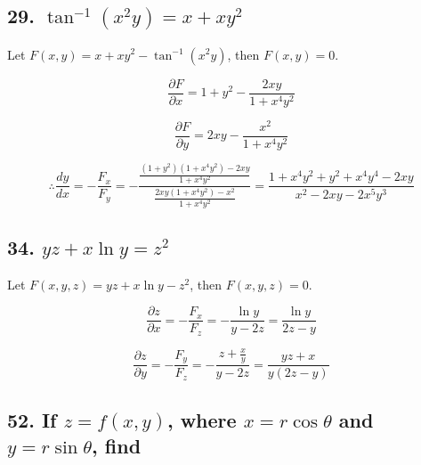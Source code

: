 \documentclass{article}
\begin{document}
    \subsection*{29. $\tan^{-1}(x^2y) = x+xy^2$}

    Let $F(x, y) = x + xy^2 - \tan^{-1}(x^2y)$, then $F(x, y) = 0$.
    
    $$\frac{\partial F}{\partial x} = 1 + y^2 - \frac{2xy}{1+x^4y^2}$$

    $$\frac{\partial F}{\partial y} = 2xy - \frac{x^2}{1+x^4y^2}$$

    $$\therefore \frac{dy}{dx} = -\frac{F_x}{F_y} = -\frac{\frac{(1+y^2)(1+x^4y^2)-2xy}{1+x^4y^2}}{\frac{2xy(1+x^4y^2)-x^2}{1+x^4y^2}} = \frac{1+x^4y^2+y^2+x^4y^4-2xy}{x^2-2xy-2x^5y^3}$$

    \subsection*{34. $yz+x\ln y =z^2$}

    Let $F(x, y, z) = yz+x\ln y-z^2$, then $F(x, y, z) = 0$.

    $$\frac{\partial z}{\partial x} = -\frac{F_x}{F_z} = -\frac{\ln y}{y-2z} = \frac{\ln y}{2z-y}$$

    $$\frac{\partial z}{\partial y} = -\frac{F_y}{F_z} = -\frac{z+\frac x y}{y-2z} = \frac{yz+x}{y(2z-y)}$$

    \subsection*{52. If $z = f(x, y)$, where $x=r\cos \theta$ and $y=r \sin \theta$, find}
\end{document}
